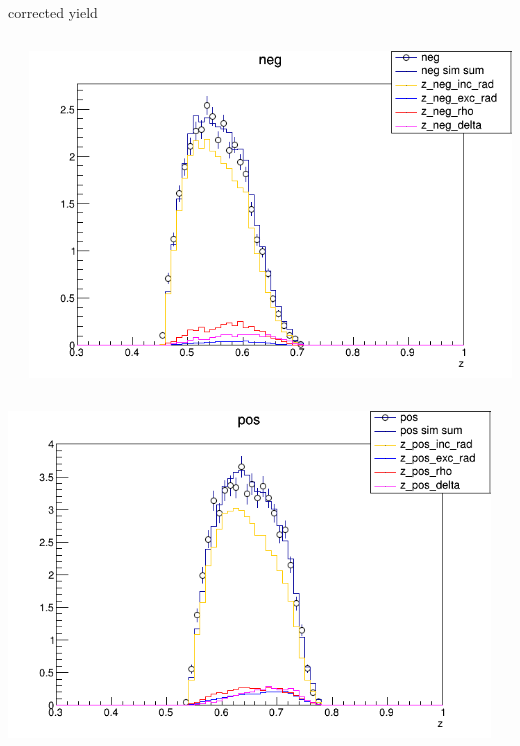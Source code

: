 \begin{frame}{corrected yield}
\begin{columns}
\begin{column}[T]{0.25\textwidth}
\end{column}
\begin{column}[T]{0.25\textwidth}
\includegraphics[width = \textwidth]{results/yield/statistics_corr/yield_x_Q2_z_0.60_5.500_0.55_neg.png}
\end{column}
\end{columns}
\begin{columns}
\begin{column}[T]{0.25\textwidth}
\includegraphics[width = \textwidth]{results/yield/statistics_corr/yield_x_Q2_z_0.60_5.500_0.65_pos.png}
\end{column}
\begin{column}[T]{0.25\textwidth}

\end{column}
\end{columns}
\end{frame}
